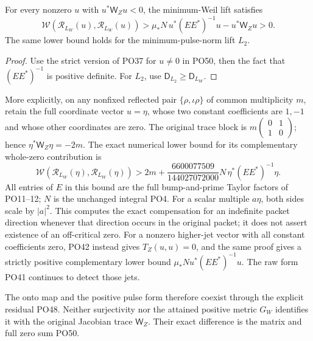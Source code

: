 \begin{corollary}
\label{PO:cor:negative}
For every nonzero \(u\) with \(u^*\mathsf W_Zu<0\),
the minimum-Weil lift satisfies
\[
 \mathcal W(\mathcal R_{L_W}(u),\mathcal R_{L_W}(u))
 >\mu_*N\,u^*(EE^*)^{-1}u-u^*\mathsf W_Zu>0.
 \tag{PO52}\label{PO:po:negative}
\]
The same lower bound holds for the minimum-pulse-norm lift \(L_2\).
\end{corollary}
\begin{proof}
Use the strict version of PO37 for \(u\ne0\) in PO50,
then the fact that \((EE^*)^{-1}\) is positive definite.
For \(L_2\), use \(\mathsf D_{L_2}\ge\mathsf D_{L_W}\).
\end{proof}

More explicitly, on any nonfixed reflected pair
\(\{\rho,\iota\rho\}\) of common multiplicity \(m\), retain the
full coordinate vector \(u=\eta\), whose two constant
coefficients are \(1,-1\) and whose other coordinates are zero.
The original trace block is
\(m\left(\begin{smallmatrix}0&1\\1&0\end{smallmatrix}\right)\);
hence \(\eta^*\mathsf W_Z\eta=-2m\).
The exact numerical lower bound for its complementary
whole-zero contribution is
\[
 \mathcal W(\mathcal R_{L_W}(\eta),\mathcal R_{L_W}(\eta))
 >2m+
    \frac{6600077509}{144027072000}
            N\,\eta^*(EE^*)^{-1}\eta .
 \tag{PO53}\label{PO:po:pair-bound}
\]
All entries of \(E\) in this bound are the full bump-and-prime
Taylor factors of PO11--12; \(N\) is the unchanged integral PO4.
For a scalar multiple \(a\eta\), both sides scale by \(|a|^2\).
This computes the exact compensation for an indefinite packet
direction whenever that direction occurs in the original packet;
it does not assert existence of an off-critical zero.
For a nonzero higher-jet vector with all constant coefficients
zero, PO42 instead gives \(T_Z(u,u)=0\), and the same proof gives
a strictly positive complementary lower bound
\(\mu_*N u^*(EE^*)^{-1}u\).
The raw form PO41 continues to detect those jets.

The onto map and the positive pulse form therefore coexist
through the explicit residual PO48. Neither surjectivity nor
the attained positive metric \(G_W\) identifies it with
the original Jacobian trace \(\mathsf W_Z\).
Their exact difference is the matrix and full zero sum PO50.


